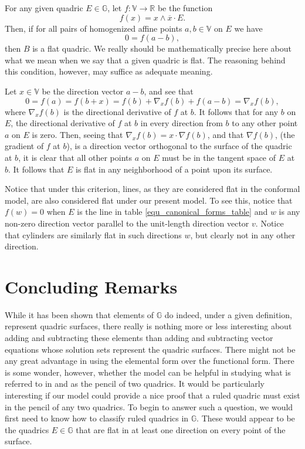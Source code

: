 \documentclass{birkjour}
\theoremstyle{definition}
\theoremstyle{remark}
\numberwithin{equation}{section}
\newcommand{\G}{\mathbb{G}}
\newcommand{\V}{\mathbb{V}}
\newcommand{\R}{\mathbb{R}}
\begin{document}
For any given quadric $E\in\G$, let $f:\V\to\R$ be the function
\begin{equation}
f(x) = x\wedge\overline{x}\cdot E.
\end{equation}
Then, if for all pairs of homogenized affine points $a,b\in\V$
on $E$ we have
\begin{equation}
0=f(a-b),
\end{equation}
then $B$ is a flat quadric.  We really
should be mathematically precise here about what we mean when
we say that a given quadric is flat.  The reasoning behind this
condition, however, may suffice as adequate meaning.

Let $x\in\V$ be the direction vector $a-b$, and see that
\begin{equation}
0=f(a) = f(b+x) = f(b) + \nabla_x f(b) + f(a-b) = \nabla_x f(b),
\end{equation}
where $\nabla_x f(b)$ is the directional derivative of $f$ at $b$.
It follows that for any $b$ on $E$, the directional derivative of $f$ at $b$ in every
direction from $b$ to any other point $a$ on $E$ is zero.  Then, seeing that
$\nabla_x f(b)=x\cdot\nabla f(b)$, and that $\nabla f(b)$, (the gradient of
$f$ at $b$), is a direction vector orthogonal to the surface of the quadric at $b$,
it is clear that all other points $a$ on $E$ must be in the tangent space
of $E$ at $b$.  It follows that $E$ is flat in any neighborhood of a point
upon its surface.

Notice that under this criterion, lines, as they are considered flat in the conformal
model, are also considered flat under our present model.  To see this, notice that $f(w)=0$ when
$E$ is the line in table \eqref{equ_canonical_forms_table} and $w$ is any non-zero direction
vector parallel to the unit-length direction vector $v$.  Notice that cylinders are similarly
flat in such directions $w$, but clearly not in any other direction.

\section{Concluding Remarks}

While it has been shown that elements of $\G$ do indeed, under a given
definition, represent quadric surfaces, there really is nothing more or less
interesting about adding and subtracting these elements than adding and
subtracting vector equations whose solution sets represent the quadric surfaces.
There might not be any great advantage in using the elemental form over the
functional form.  There is some wonder, however, whether the model can
be helpful in studying what is referred to in \cite{Miller87}
and \cite{ZhiqiangXu05} as the pencil of two quadrics.
It would be particularly interesting if our model could provide a nice proof
that a ruled quadric must exist in the pencil of any two quadrics.
To begin to answer such a question, we would first need to know
how to classify ruled quadrics in $\G$.  These would appear to be the
quadrics $E\in\G$ that are flat in at least one direction on every point
of the surface.
\end{document}
